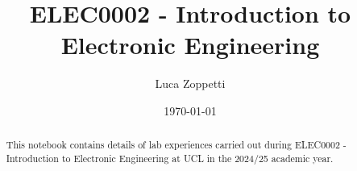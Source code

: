 \documentclass{article}
\author{Luca Zoppetti}
\title{ELEC0002 - Introduction to Electronic Engineering}
\date{\today}
\begin{document}
\maketitle
\begin{abstract}
	This notebook contains details of lab experiences carried out during ELEC0002 - Introduction to Electronic Engineering at UCL in the 2024/25 academic year.
\end{abstract}
\tableofcontents



\end{document}
